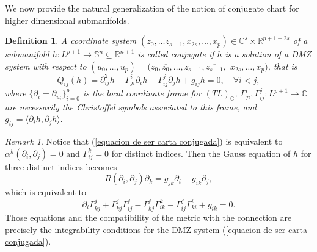 \documentclass{article}
\newtheorem{defn}[thm]{Definition}
\theoremstyle{remark}
\newtheorem{remark}[thm]{Remark}
\begin{document}
We now provide the natural generalization of the notion of conjugate chart for higher dimensional submanifolds.
\begin{defn}\label{definicion de carta conjugada}
    \normalfont A coordinate system $(z_0,\ldots z_{s-1},x_{2s},\ldots, x_{p})\in\mathbb{C}^s\times\mathbb{R}^{p+1-2s}$ of a submanifold $h:L^{p+1}\rightarrow\mathbb{S}^n\subseteq\mathbb{R}^{n+1}$ is called {\it conjugate} if $h$ is a solution of a DMZ system with respect to $(u_0,\ldots,u_{p})=(z_0,\overline{z_0},\ldots,z_{s-1},\overline{z_{s-1}},$
    $x_{2s},\ldots,x_{p})$, that is
    \begin{equation}\label{equacion de ser carta conjugada}
        Q_{ij}(h)=\partial^2_{ij}h-\Gamma_{ji}^i\partial_ih-\Gamma_{ij}^j\partial_jh+g_{ij}h=0, \quad \forall i< j,
    \end{equation}
    where $\{\partial_i=\partial_{u_i}\}_{i=0}^p$ is the local coordinate frame for $(TL)_{\mathbb{C}}$, $\Gamma_{ji}^i,\Gamma_{ij}^j:L^{p+1}\rightarrow\mathbb{C}$ are necessarily the Christoffel symbols associated to this frame, and $g_{ij}=\langle\partial_ih,\partial_jh\rangle.$ 
\end{defn}
\begin{remark}\label{condicion integrabilidad carta conjugada}
    Notice that (\ref{equacion de ser carta conjugada}) is equivalent to $\alpha^h(\partial_i,\partial_j)=0$ and $\Gamma_{ij}^k=0$ for distinct indices. Then the Gauss equation of $h$ for three distinct indices becomes
    $$R(\partial_i,\partial_j)\partial_k=g_{jk}\partial_i-g_{ik}\partial_j,$$
    which is equivalent to 
    \begin{equation}\label{integrabilidad definicion de conjugada}
        \partial_i\Gamma^j_{kj}+\Gamma^j_{kj}\Gamma^j_{ij}-\Gamma^j_{kj}\Gamma^k_{ik}-\Gamma^j_{ij}\Gamma^i_{ki}+g_{ik}=0.
    \end{equation}
    Those equations and the compatibility of the metric with the connection are precisely the integrability conditions for the DMZ system (\ref{equacion de ser carta conjugada}).
\end{remark}
\end{document}

